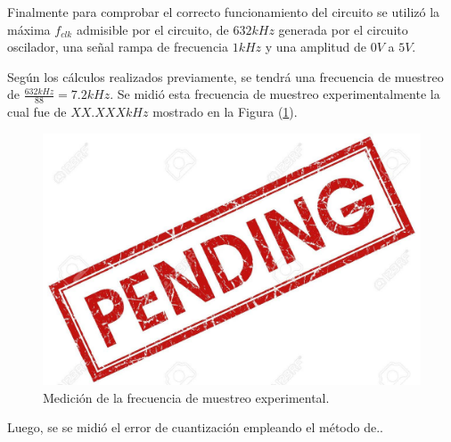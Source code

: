 Finalmente para comprobar el correcto funcionamiento del circuito se utilizó la máxima $f_{clk}$ admisible por el circuito, de $632kHz$ generada por el circuito oscilador, una señal rampa de frecuencia $1kHz$ y una amplitud de $0V$ a $5V$.

Según los cálculos realizados previamente, se tendrá una frecuencia de muestreo de $\frac{632kHz}{88} = 7.2kHz$. Se midió esta frecuencia de muestreo experimentalmente la cual fue de $XX.XXXkHz$ mostrado en la Figura (\ref{med1}).

\begin{figure}[H]
\centering
\includegraphics[width=0.6\linewidth]{ImagenesEjercicio1/pend.jpg}
\caption{Medición de la frecuencia de muestreo experimental.}
\label{med1}
\end{figure}

Luego, se se midió el error de cuantización empleando el método de..



